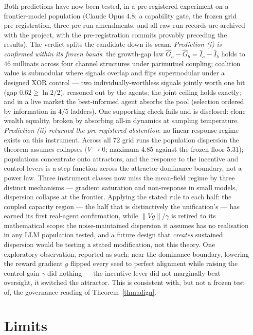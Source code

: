 \documentclass[11pt]{article}
\theoremstyle{plain}
\theoremstyle{definition}
\theoremstyle{remark}
\newcommand{\I}{I}
\begin{document}
Both predictions have now been tested, in a pre-registered experiment on a frontier-model population
(Claude Opus 4.8; a capability gate, the frozen grid pre-registration, three pre-run amendments, and all raw
run records are archived with the project, with the pre-registration commits provably preceding the results).
The verdict splits the candidate down its seam. \emph{Prediction (i) is confirmed within its frozen bands}: the
growth-gap law $\hat G_a-\hat G_b=\hat\I_a-\hat\I_b$ holds to $46$ millinats across four channel structures
under parimutuel coupling; coalition value is submodular where signals overlap and flips supermodular under a
designed XOR control --- two individually-worthless signals jointly worth one bit (gap $0.62\ge\ln 2/2$),
reasoned out by the agents; the joint ceiling holds exactly; and in a live market the best-informed agent
absorbs the pool (selection ordered by information in $4/5$ ladders). One supporting check fails and is
disclosed: clone wealth equality, broken by absorbing all-in dynamics at sampling temperature.
\emph{Prediction (ii) returned the pre-registered abstention}: no linear-response regime exists on this
instrument. Across all $72$ grid runs the population dispersion the theorem assumes collapses ($V\to 0$;
maximum $4.85$ against the frozen floor $5.31$); populations concentrate onto attractors, and the response to
the incentive and control levers is a step function across the attractor-dominance boundary, not a power law.
Three instrument classes now miss the mean-field regime by three distinct mechanisms --- gradient saturation
and non-response in small models, dispersion collapse at the frontier. Applying the stated rule to each half:
the coupled capacity region --- the half that is distinctively the unification's --- has earned its first
real-agent confirmation, while $\|Vg\|/\gamma$ is retired to its mathematical scope: the noise-maintained
dispersion it assumes has no realisation in any LLM population tested, and a future design that \emph{creates}
sustained dispersion would be testing a stated modification, not this theory. One exploratory observation,
reported as such: near the dominance boundary, lowering the reward gradient $g$ flipped every seed to perfect
alignment while raising the control gain $\gamma$ did nothing --- the incentive lever did not marginally beat
oversight, it switched the attractor. This is consistent with, but not a frozen test of, the governance reading
of Theorem~\ref{thm:align}.

\section{Limits}\label{sec:limits}
\end{document}
